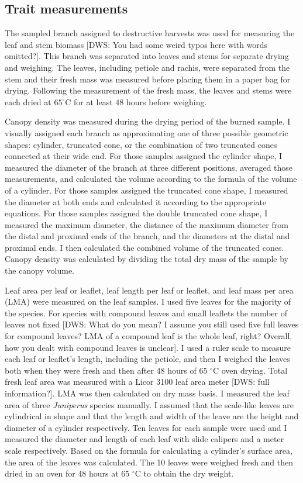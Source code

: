 \documentclass[12pt]{report}
\begin{document}
\subsection{Trait measurements}
The sampled branch assigned to destructive harvests was used for measuring the leaf and stem biomass [DWS: You had some weird typos here with words omitted?]. This branch was separated into leaves and stems for separate drying and weighing. The leaves, including petiole and rachis, were separated from the stem and their fresh mass was measured before placing them in a paper bag for drying. Following the measurement of the fresh mass, the leaves and stems were each dried at $65^{\circ}$C for at least 48 hours before weighing.

Canopy density was measured during the drying period of the burned sample. I visually assigned each branch as approximating one of three possible geometric shapes: cylinder, truncated cone, or the combination of two truncated cones connected at their wide end. For those samples assigned the cylinder shape, I measured the diameter of the branch at three different positions, averaged those measurements, and calculated the volume according to the formula of the volume of a cylinder. For those samples assigned the truncated cone shape, I measured the diameter at both ends and calculated it according to the appropriate equations. For those samples assigned the double truncated cone shape, I measured the maximum diameter, the distance of the maximum diameter from the distal and proximal ends of the branch, and the diameters at the distal and proximal ends. I then calculated the combined volume of the truncated cones. Canopy density was calculated by dividing the total dry mass of the sample by the canopy volume.

Leaf area per leaf or leaflet, leaf length per leaf or leaflet, and leaf mass per area (LMA) were measured on the leaf samples. I used five leaves for the majority of the species. For species with compound leaves and small leaflets the number of leaves not fixed [DWS: What do you mean? I assume you still used five full leaves for compound leaves? LMA of a compound leaf is the whole leaf, right? Overall, how you dealt with compound leaves is unclear]. I used a ruler scale to measure each leaf or leaflet's length, including the petiole, and then I weighed the leaves both when they were fresh and then after 48 hours of 65 $^{\circ}$C oven drying. Total fresh leaf area was measured with a Licor 3100 leaf area meter [DWS: full information?]. LMA was then calculated on  dry mass basis. I measured the leaf area of three \emph{Juniperus} species manually. I assumed that the scale-like leaves are cylindrical in shape and that the length and width of the leave are the height and diameter of a cylinder respectively. Ten leaves for each sample were used and I measured the diameter and length of each leaf with slide calipers and a meter scale respectively. Based on the formula for calculating a cylinder's surface area, the area of the leaves was calculated. The 10 leaves were weighed fresh and then dried in an oven for 48 hours at 65 $^{\circ}$C to obtain the dry weight.
\end{document}

